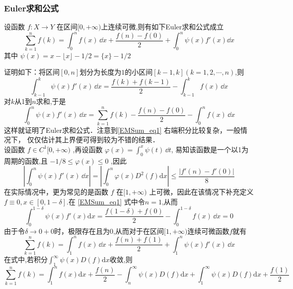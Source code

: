 
\subsubsection{Euler求和公式}
\begin{theorem}{}
    设函数 $f:X\to Y$ 在区间$[0,+\infty)$上连续可微,则有如下Euler求和公式成立	
        \begin{equation}\label{EMSum_eq1} 
            \sum_{k=1}^{n}f(k)=\int_{0}^{n}f(x)\,\dd x
            +\frac{f(n)-f(0)}{2}+\int_{0}^{n}\psi(x)f'(x)\dd x
        \end{equation}
    其中 $\psi(x)=x-\lfloor x \rfloor-1/2=\{x\}-1/2$
\end{theorem}
证明如下：将区间$[0,n]$划分为长度为$1$的小区间$[k-1,k](k=1,2,\cdots,n)$,则
​\[
    \int_{k-1}^{k}\psi(x)f'(x)\,\dd x
    =\frac{f(k)+f(k-1)}{2}-\int_{k-1}^{k}f(x)\,\dd x
\]
​对$k$从1到$n$求和,于是
​\[
    \int_{0}^{n}\psi(x)f'(x)\,\dd x
    =\sum_{k=1}^{n}f(k)-\frac{f(n)-f(0)}{2}-\int_{0}^{n}f(x)\,\dd x
\]
这样就证明了Euler求和公式．注意到\autoref{EMSum_eq1} 右端积分比较复杂，一般情况下，
仅仅估计其上界便可得到较为不错的结果．\\
设函数 $f\in{C^1[0,+\infty)}$ ,再设函数
$\varphi(x)=\displaystyle{\int_{0}^{x}\psi(t)\,\dd t}$,
易知该函数是一个以1为周期的函数,且
 $-1/8\leqslant\varphi(x)\leqslant 0$ ,因此
\begin{equation}
    \left|\int_{0}^{n}\psi(x)f'(x)\,\dd x\right|
    =\left|\int_{0}^{n}\varphi(x)D^2(f)\mathrm{d}x\right|
    \leqslant\frac{|f'(n)-f'(0)|}{8}
\end{equation}
在实际情况中，更为常见的是函数 $f$ 在$[1,+\infty)$ 上可微，因此在该情况下补充定义$ f\equiv 0,x\in[0,1-\delta]$.在 \autoref{EMSum_eq1} 式中令$n=1$,从而
\[
    \int_{0}^{1-\delta}\psi(x)f'(x)\mathrm{d}x
    =\frac{f(1-\delta)+f(0)}{2}-\int_{0}^{1-\delta}f(x)\,\dd x=0
\]
由于令$\delta\to0+0$时，极限存在且为$0$,从而对于在区间$[1,+\infty)$连续可微函数$f$就有
	\begin{equation}
		\sum_{k=1}^{n}f(k)
        =\int_{1}^{n}f(x)\,\dd x+\frac{f(n)+f(1)}{2}+\int_{1}^{n}\psi(x)f'(x)\,\dd x
	\end{equation}
	在式中,若积分$\displaystyle{\int_{1}^{\infty}\psi(x)D(f)\mathrm{d}x}$收敛,则
	\begin{equation}
		\sum_{k=1}^{n}f(k)=\int_{1}^{n}f(x)\mathrm{d}x+\frac{f(n)}{2}-\int_{n}^{\infty}\psi(x)D(f)\mathrm{d}x
		+\int_{1}^{\infty}\psi(x)D(f)\mathrm{d}x+\frac{f(1)}{2}
	\end{equation}